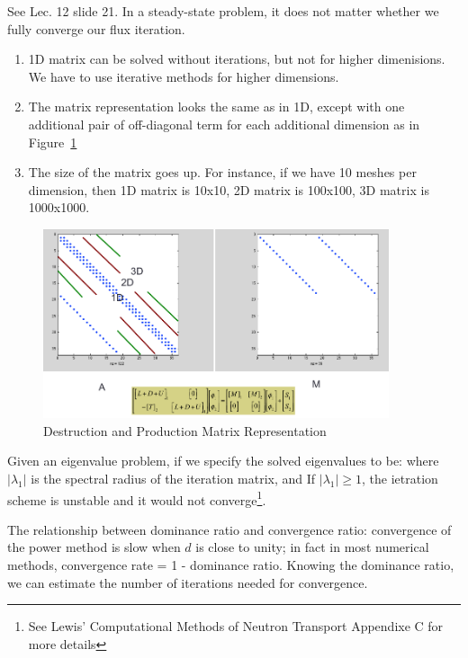 \documentclass{school-22.211-notes}
\begin{document}
See Lec. 12 slide 21. In a steady-state problem, it does not matter whether we fully converge our flux iteration. 


\clearpage
{}
\begin{enumerate}
\item 1D matrix can be solved without iterations, but not for higher dimenisions. We have to use iterative methods for higher dimensions. 
\item The matrix representation looks the same as in 1D, except with one additional pair of off-diagonal term for each additional dimension as in Figure~\ref{matrix-shape}
\item The size of the matrix goes up. For instance, if we have 10 meshes per dimension, then 1D matrix is 10x10, 2D matrix is 100x100, 3D matrix is 1000x1000.
\end{enumerate}
\begin{figure}
  \centering
  \includegraphics[width=4in]{images/dfs/matrix_multidimension.png}
  \caption{Destruction and Production Matrix Representation} \label{matrix-shape}
\end{figure}

\clearpage
{}
Given an eigenvalue problem, if we specify the solved eigenvalues to be:
where $|\lambda_1|$ is the spectral radius of the iteration matrix, and 
If $|\lambda_1| \ge 1$, the ietration scheme is unstable and it would not converge\footnote{See Lewis' Computational Methods of Neutron Transport Appendixe C for more details}. 

The relationship between dominance ratio and convergence ratio: convergence of the power method is slow when $d$ is close to unity; in fact in most numerical methods, convergence rate = 1 - dominance ratio. Knowing the dominance ratio, we can estimate the number of iterations needed for convergence. 
\end{document}
